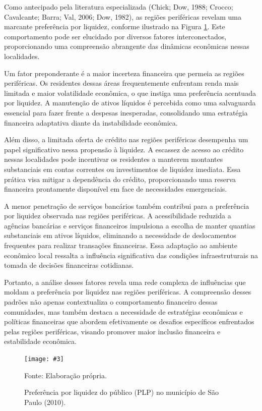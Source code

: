 \documentclass[a4paper,12pt]{article}
\newcommand{\fig}[4]{%
  \begin{figure}[H]
    \centering
    \caption{#1}
    \label{#2}
    \texttt{[image: \#3]}
    
    \vspace{0.5cm}
    
    \begin{footnotesize}
      Fonte: #4
    \end{footnotesize}
  \end{figure}
}
\begin{document}
Como antecipado pela literatura especializada (Chick; Dow, 1988; Crocco;
Cavalcante; Barra; Val, 2006; Dow, 1982), as regiões periféricas revelam
uma marcante preferência por liquidez, conforme ilustrado na Figura
\ref{fig:plp}. Este comportamento pode ser elucidado por diversos
fatores interconectados, proporcionando uma compreensão abrangente das
dinâmicas econômicas nessas localidades.

Um fator preponderante é a maior incerteza financeira que permeia as
regiões periféricas. Os residentes dessas áreas frequentemente enfrentam
renda mais limitada e maior volatilidade econômica, o que instiga uma
preferência acentuada por liquidez. A manutenção de ativos líquidos é
percebida como uma salvaguarda essencial para fazer frente a despesas
inesperadas, consolidando uma estratégia financeira adaptativa diante da
instabilidade econômica.

Além disso, a limitada oferta de crédito nas regiões periféricas
desempenha um papel significativo nessa propensão à liquidez. A escassez
de acesso ao crédito nessas localidades pode incentivar os residentes a
manterem montantes substanciais em contas correntes ou investimentos de
liquidez imediata. Essa prática visa mitigar a dependência do crédito,
proporcionando uma reserva financeira prontamente disponível em face de
necessidades emergenciais.

A menor penetração de serviços bancários também contribui para a
preferência por liquidez observada nas regiões periféricas. A
acessibilidade reduzida a agências bancárias e serviços financeiros
impulsiona a escolha de manter quantias substanciais em ativos líquidos,
eliminando a necessidade de deslocamentos frequentes para realizar
transações financeiras. Essa adaptação ao ambiente econômico local
ressalta a influência significativa das condições infraestruturais na
tomada de decisões financeiras cotidianas.

Portanto, a análise desses fatores revela uma rede complexa de
influências que moldam a preferência por liquidez nas regiões
periféricas. A compreensão desses padrões não apenas contextualiza o
comportamento financeiro dessas comunidades, mas também destaca a
necessidade de estratégias econômicas e políticas financeiras que
abordem efetivamente os desafios específicos enfrentados pelas regiões
periféricas, visando promover maior inclusão financeira e estabilidade
econômica.

\fig{Preferência por liquidez do público (PLP) no município de São Paulo (2010).}{fig:plp}{exports/plp2.pdf}{Elaboração própria.}
\end{document}
